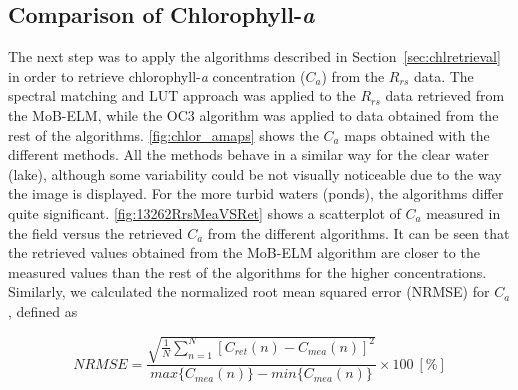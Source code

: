 \documentclass[draft]{spie}  %
\begin{document}
\subsection{Comparison of Chlorophyll-{\it a}}
The next step was to apply the algorithms described in Section~\ref{sec:chlretrieval} in order to retrieve chlorophyll-{\it a} concentration ($C_a$) from the $R_{rs}$ data. The spectral matching and LUT approach was applied to the $R_{rs}$ data retrieved from the MoB-ELM, while the OC3 algorithm was applied to data obtained from the rest of the algorithms. \autoref{fig:chlor_amaps} shows the $C_a$ maps obtained with the different methods. All the methods behave in a similar way for the clear water (lake), although some variability could be not visually noticeable due to the way the image is displayed. For the more turbid waters (ponds), the algorithms differ quite significant. \autoref{fig:13262RrsMeaVSRet} shows a scatterplot of $C_a$ measured in the field versus the retrieved $C_a$ from the different algorithms. It can be seen that the retrieved values obtained from the MoB-ELM algorithm are closer to the measured values than the rest of the algorithms for the higher concentrations. Similarly, we calculated the normalized root mean squared error (NRMSE) for $C_a$, defined as

\begin{equation}
\label{eq:NRMSEchl}
	NRMSE =\frac{\sqrt{\frac{1}{N}\sum_{n=1}^N{\left[C_{ret}(n) - C_{mea}(n)\right]^2}}}{max\{C_{mea}(n)\} - min\{C_{mea}(n)\}}\times100 ~[\%]
\end{equation}
\end{document}
